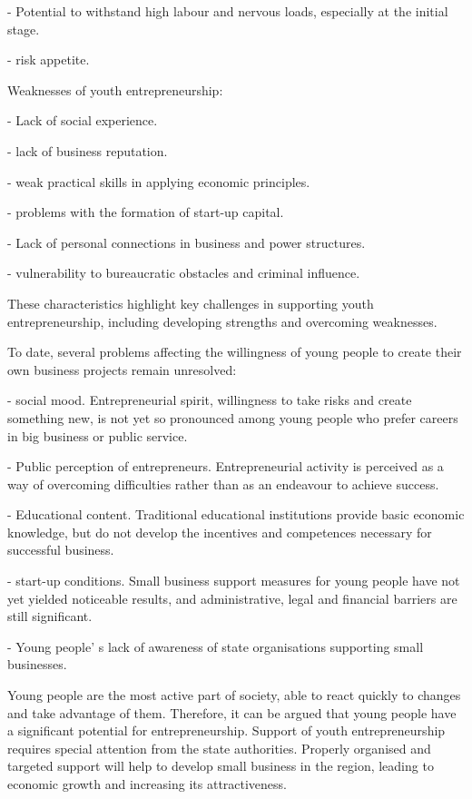 \begin{multicols}{2}
- Potential to withstand high labour and nervous loads, especially at
the initial stage.

- risk appetite.

Weaknesses of youth entrepreneurship:

- Lack of social experience.

- lack of business reputation.

- weak practical skills in applying economic principles.

- problems with the formation of start-up capital.

- Lack of personal connections in business and power structures.

- vulnerability to bureaucratic obstacles and criminal influence.

These characteristics highlight key challenges in supporting youth
entrepreneurship, including developing strengths and overcoming
weaknesses.

To date, several problems affecting the willingness of young people to
create their own business projects remain unresolved:

- social mood. Entrepreneurial spirit, willingness to take risks and
create something new, is not yet so pronounced among young people who
prefer careers in big business or public service.

- Public perception of entrepreneurs. Entrepreneurial activity is
perceived as a way of overcoming difficulties rather than as an
endeavour to achieve success.

- Educational content. Traditional educational institutions provide
basic economic knowledge, but do not develop the incentives and
competences necessary for successful business.

- start-up conditions. Small business support measures for young people
have not yet yielded noticeable results, and administrative, legal and
financial barriers are still significant.

- Young people' s lack of awareness of state
organisations supporting small businesses.

Young people are the most active part of society, able to react quickly
to changes and take advantage of them. Therefore, it can be argued that
young people have a significant potential for entrepreneurship. Support
of youth entrepreneurship requires special attention from the state
authorities. Properly organised and targeted support will help to
develop small business in the region, leading to economic growth and
increasing its attractiveness.


\end{multicols}
